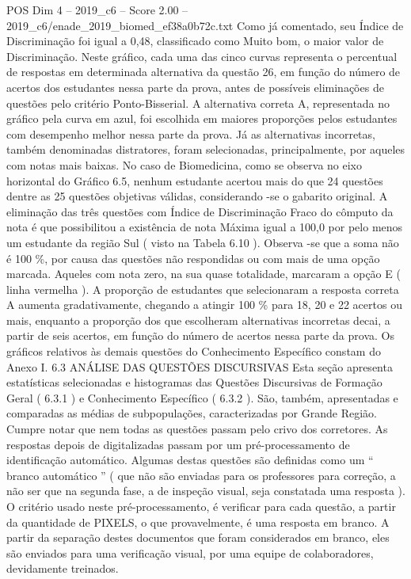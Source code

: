 \begin{textsample}{POS Dim 4 – 2019\_c6 – Score 2.00 – 2019\_c6/enade\_2019\_biomed\_ef38a0b72c.txt}
Como já comentado, seu Índice de Discriminação foi igual a 0,48, classificado como Muito bom, o maior valor de Discriminação.
Neste gráfico, cada uma das cinco curvas representa o percentual de respostas em determinada alternativa da questão 26, em função do número de acertos dos estudantes nessa parte da prova, antes de possíveis eliminações de questões pelo critério Ponto-Bisserial.
A alternativa correta A, representada no gráfico pela curva em azul, foi escolhida em maiores proporções pelos estudantes com desempenho melhor nessa parte da prova.
Já as alternativas incorretas, também denominadas distratores, foram selecionadas, principalmente, por aqueles com notas mais baixas.
No caso de Biomedicina, como se observa no eixo horizontal do Gráfico 6.5, nenhum estudante acertou mais do que 24 questões dentre as 25 questões objetivas válidas, considerando -se o gabarito original.
A eliminação das três questões com Índice de Discriminação Fraco do cômputo da nota é que possibilitou a existência de nota Máxima igual a 100,0 por pelo menos um estudante da região Sul ( visto na Tabela 6.10 ).
Observa -se que a soma não é 100 \%, por causa das questões não respondidas ou com mais de uma opção marcada.
Aqueles com nota zero, na sua quase totalidade, marcaram a opção E ( linha vermelha ).
A proporção de estudantes que selecionaram a resposta correta A aumenta gradativamente, chegando a atingir 100 \% para 18, 20 e 22 acertos ou mais, enquanto a proporção dos que escolheram alternativas incorretas decai, a partir de seis acertos, em função do número de acertos nessa parte da prova.
Os gráficos relativos às demais questões do Conhecimento Específico constam do Anexo I. 6.3 ANÁLISE DAS QUESTÕES DISCURSIVAS Esta seção apresenta estatísticas selecionadas e histogramas das Questões Discursivas de Formação Geral ( 6.3.1 ) e Conhecimento Específico ( 6.3.2 ).
São, também, apresentadas e comparadas as médias de subpopulações, caracterizadas por Grande Região.
Cumpre notar que nem todas as questões passam pelo crivo dos corretores.
As respostas depois de digitalizadas passam por um pré-processamento de identificação automático.
Algumas destas questões são definidas como um “ branco automático ” ( que não são enviadas para os professores para correção, a não ser que na segunda fase, a de inspeção visual, seja constatada uma resposta ).
O critério usado neste pré-processamento, é verificar para cada questão, a partir da quantidade de PIXELS, o que provavelmente, é uma resposta em branco.
A partir da separação destes documentos que foram considerados em branco, eles são enviados para uma verificação visual, por uma equipe de colaboradores, devidamente treinados.

\end{textsample}
